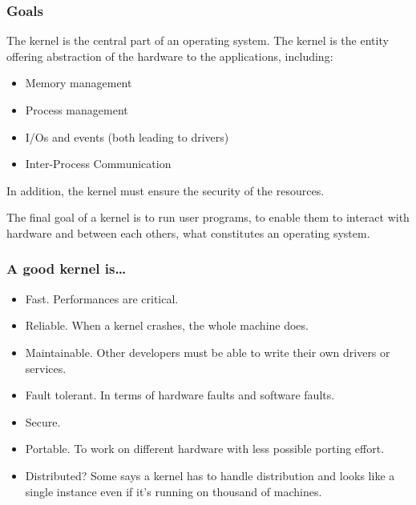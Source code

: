 \begin{frame}
  \frametitle{Goals}

  The kernel is the central part of an operating system. The kernel is the entity offering abstraction of the hardware to the applications, including:

  \begin{itemize}
  \item
    Memory management
  \item
    Process management
  \item
    I/Os and events (both leading to drivers)
  \item
    Inter-Process Communication
  \end{itemize}

  In addition, the kernel must ensure the security of the resources.

  \-

  The final goal of a kernel is to run user programs, to enable them
  to interact with hardware and between each others, what constitutes
  an operating system.

\end{frame}


\begin{frame}
  \frametitle{A good kernel is\ldots}

  \begin{itemize}
  \item
    Fast. Performances are critical.
  \item
    Reliable. When a kernel crashes, the whole machine does.
  \item
    Maintainable. Other developers must be able to write their own drivers or services.
  \item
    Fault tolerant. In terms of hardware faults and software faults.
  \item
    Secure.
  \item
    Portable. To work on different hardware with less possible porting effort.
  \item
    Distributed? Some says a kernel has to handle distribution and looks like a single instance even if it's running on thousand of machines.
  \end{itemize}

\end{frame}


